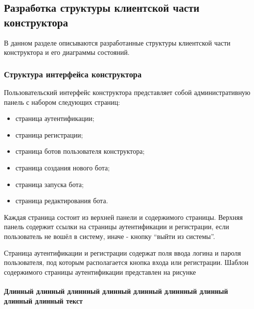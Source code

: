 \subsection{Разработка структуры клиентской части конструктора}


В данном разделе описываются разработанные структуры клиентской части
конструктора и его диаграммы состояний.

\subsubsection{Структура интерфейса конструктора}

Пользовательский интерфейс конструктора представляет собой
административную панель с набором следующих страниц:

\begin{itemize}
	\item страница аутентификации;
	\item страница регистрации;
	\item страница ботов пользователя конструктора;
	\item страница создания нового бота;
	\item страница запуска бота;
	\item страница редактирования бота.
\end{itemize}


Каждая страница состоит из верхней панели и содержимого страницы.
Верхняя панель содержит ссылки на страницы аутентификации и регистрации,
если пользователь не вошёл в систему, иначе - кнопку “выйти из системы”.

Страница аутентификации и регистрации содержат поля ввода логина и
пароля пользователя, под которым располагается кнопка входа или
регистрации. Шаблон содержимого страницы аутентификации представлен на
рисунке

\paragraph{Длинный длинный длиннный длинный длинный длиннный длинный длинный длинный текст}
